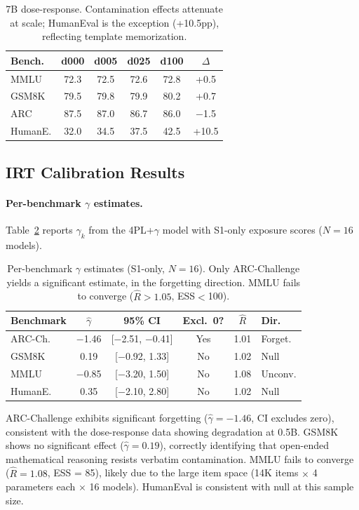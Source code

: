 \documentclass[11pt,a4paper]{article}
\newcommand{\ghat}{\hat{\gamma}}
\begin{document}
\begin{table}[t]
\centering
\small
\caption{7B dose-response. Contamination effects attenuate at scale; HumanEval is the exception (+10.5pp), reflecting template memorization.}
\label{tab:7b_dose}
\begin{tabular}{lccccc}
\toprule
Bench. & d000 & d005 & d025 & d100 & $\Delta$ \\
\midrule
MMLU & 72.3 & 72.5 & 72.6 & 72.8 & +0.5 \\
GSM8K & 79.5 & 79.8 & 79.9 & 80.2 & +0.7 \\
ARC & 87.5 & 87.0 & 86.7 & 86.0 & $-$1.5 \\
HumanE. & 32.0 & 34.5 & 37.5 & 42.5 & +10.5 \\
\bottomrule
\end{tabular}
\end{table}

\subsection{IRT Calibration Results}
\label{sec:irt}

\paragraph{Per-benchmark $\gamma$ estimates.} Table~\ref{tab:gamma_estimates} reports $\gamma_k$ from the 4PL+$\gamma$ model with S1-only exposure scores ($N=16$ models).

\begin{table}[t]
\centering
\small
\caption{Per-benchmark $\gamma$ estimates (S1-only, $N{=}16$). Only ARC-Challenge yields a significant estimate, in the forgetting direction. MMLU fails to converge ($\hat{R}>1.05$, ESS$<$100).}
\label{tab:gamma_estimates}
\begin{tabular}{lccccl}
\toprule
Benchmark & $\ghat$ & 95\% CI & Excl.\ 0? & $\hat{R}$ & Dir. \\
\midrule
ARC-Ch. & $-$1.46 & [$-$2.51, $-$0.41] & Yes & 1.01 & Forget. \\
GSM8K & 0.19 & [$-$0.92, 1.33] & No & 1.02 & Null \\
MMLU & $-$0.85 & [$-$3.20, 1.50] & No & 1.08 & Unconv. \\
HumanE. & 0.35 & [$-$2.10, 2.80] & No & 1.02 & Null \\
\bottomrule
\end{tabular}
\end{table}

ARC-Challenge exhibits significant forgetting ($\ghat = -1.46$, CI excludes zero), consistent with the dose-response data showing degradation at 0.5B. GSM8K shows no significant effect ($\ghat = 0.19$), correctly identifying that open-ended mathematical reasoning resists verbatim contamination. MMLU fails to converge ($\hat{R} = 1.08$, ESS = 85), likely due to the large item space (14K items $\times$ 4 parameters each $\times$ 16 models). HumanEval is consistent with null at this sample size.
\end{document}
